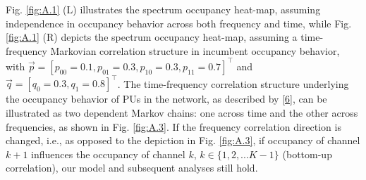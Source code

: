 \documentclass[12pt, draftcls, onecolumn]{IEEEtran}
\begin{document}
Fig. \ref{fig:A.1} (L) illustrates the spectrum occupancy heat-map, assuming independence in occupancy behavior across both frequency and time, while Fig. \ref{fig:A.1} (R) depicts the spectrum occupancy heat-map, assuming a time-frequency Markovian correlation structure in incumbent occupancy behavior, with $\vec{p}{=}[p_{00}{=}0.1,p_{01}{=}0.3,p_{10}{=}0.3,p_{11}{=}0.7]^{\intercal}$ and $\vec{q}=[q_{0}{=}0.3,q_{1}{=}0.8]^{\intercal}$. The time-frequency correlation structure underlying the occupancy behavior of PUs in the network, as described by \eqref{6}, can be illustrated as two dependent Markov chains: one across time and the other across frequencies, as shown in Fig. \ref{fig:A.3}. If the frequency correlation direction is changed, i.e., as opposed to the depiction in Fig. \ref{fig:A.3}, if occupancy of channel $k+1$ influences the occupancy of channel $k$, $k{\in}\{1,2,...K{-}1\}$ (bottom-up correlation), our model and subsequent analyses still hold.
\end{document}
